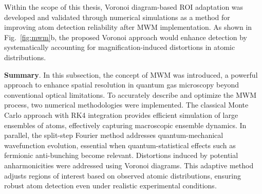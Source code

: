 Within the scope of this thesis, Voronoi diagram-based ROI adaptation was developed and validated through numerical simulations as a method for improving atom detection reliability after MWM implementation. As shown in Fig.~\ref{fig:mwm}b, the proposed Voronoi approach would enhance detection by systematically accounting for magnification-induced distortions in atomic distributions.

\textbf{Summary}. In this subsection, the concept of MWM was introduced, a powerful approach to enhance spatial resolution in quantum gas microscopy beyond conventional optical limitations.
To accurately describe and optimize the MWM process, two numerical methodologies were implemented. The classical Monte Carlo approach with RK4 integration provides efficient simulation of large ensembles of atoms, effectively capturing macroscopic ensemble dynamics. In parallel, the split-step Fourier method addresses quantum-mechanical wavefunction evolution, essential when quantum-statistical effects such as fermionic anti-bunching become relevant. Distortions induced by potential anharmonicities were addressed using Voronoi diagrams. This adaptive method adjusts regions of interest based on observed atomic distributions, ensuring robust atom detection even under realistic experimental conditions.

